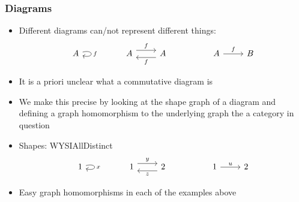 \documentclass[handout]{beamer}
\begin{document}
\frame
  {   
    \frametitle{Diagrams}\label{Ch2:Diagrams}

 \begin{itemize}[<+->]
\item Different diagrams can/not represent different things:
\[
\begin{tikzcd}[ampersand replacement=\&]
A\arrow[loop right]{l}{f} \& \&
A \arrow[yshift=1ex]{r}{f} \& A \arrow[yshift=-1ex]{l}{f}  \& \&
A \arrow{r}{f} \& B
\end{tikzcd}
\]
\item It is a priori unclear what a commutative diagram is
\item We make this precise by looking at the shape graph  of a
diagram and defining a graph homomorphism to the underlying graph the
a category in question
\item  Shapes: WYSIAllDistinct
\[
\begin{tikzcd}[ampersand replacement=\&]
1\arrow[loop right]{l}{x} \& \&
1 \arrow[yshift=1ex]{r}{y} \& 2 \arrow[yshift=-1ex]{l}{z}  \& \&
1 \arrow{r}{u} \& 2
\end{tikzcd}
\]
\item Easy graph homomorphisms in each of the examples above
 \end{itemize}

 }
\end{document}
